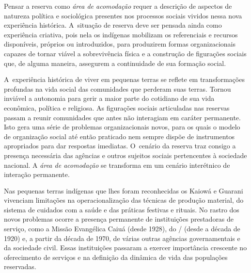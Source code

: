 Pensar a reserva como \emph{área de acomodação} requer a descrição de aspectos
de natureza política e sociológica presentes nos processos sociais
vividos nessa nova experiência histórica. A~situação de reserva deve
ser pensada ainda como experiência criativa, pois nela os indígenas
mobilizam os referenciais e recursos disponíveis, próprios ou
introduzidos, para produzirem formas organizacionais capazes de tornar
viável a sobrevivência física e a construção de figurações sociais que,
de alguma maneira, assegurem a continuidade de sua formação social. 

A~experiência histórica de viver em pequenas terras se reflete em
transformações profundas na vida social das comunidades que perderam
suas terras. Tornou inviável a autonomia para gerir a maior parte do
cotidiano de sua vida econômica, política e religiosa. As figurações
sociais articuladas nas reservas passam a reunir comunidades que antes
não interagiam em caráter permanente. Isto gera uma série de problemas
organizacionais novos, para os quais o modelo de organização social até
então praticado nem sempre dispõe de instrumentos apropriados para dar
respostas imediatas. O~cenário da reserva traz consigo a presença necessária das
agências e outros sujeitos sociais pertencentes à sociedade nacional. A
\emph{área de acomodação} se transforma em um cenário interétnico de interação
permanente.

Nas pequenas terras indígenas que lhes foram reconhecidas os Kaiowá e
Guarani vivenciam limitações na operacionalização das técnicas de
produção material, do sistema de cuidados com a saúde e das práticas
festivas e rituais. No rastro dos novos problemas ocorre a presença
permanente de instituições prestadoras de serviço, como a Missão
Evangélica Caiuá (desde 1928), do / (desde a década de 1920) e,
a partir da década de 1970, de várias outras agências governamentais e
da sociedade civil. Essas instituições passaram a exercer importância
crescente no oferecimento de serviços e na definição da dinâmica de
vida das populações reservadas.

